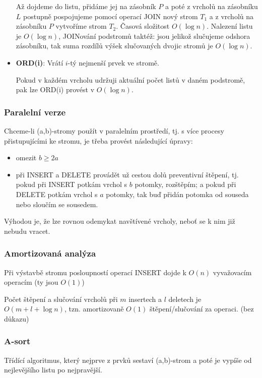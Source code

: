 \documentclass[11pt]{report} %
\numberwithin{equation}{section}
\begin{document}
\begin{itemize}
	Až dojdeme do listu, přidáme jej na zásobník $P$ a poté z vrcholů na zásobníku $L$ postupně pospojujeme pomocí operací JOIN nový strom $T_1$ a z vrcholů na zásobníku $P$ vytvoříme strom $T_2$. 
	Časová složitost $O(\log n)$. Nalezení listu je $O(\log n)$, JOINování podstromů taktéž: jsou jelikož slučujeme odshora zásobníku, tak suma rozdílů výšek slučovaných dvojic stromů je $O(\log n)$.
	
	\item \textbf{ORD(i)}:
	Vrátí $i$-tý nejmenší prvek ve stromě. 
	
	Pokud v každém vrcholu udržuji aktuální počet listů v daném podstromě, pak lze ORD(i) provést v $O(\log n)$.
	
	
\end{itemize}

\subsubsection{Paralelní verze}
Chceme-li (a,b)-stromy použít v paralelním prostředí, tj. s více procesy přistupujícími ke stromu, je třeba provést následující úpravy:
\begin{itemize}
	
	
	\item omezit $b \geq 2a$
	\item při INSERT a DELETE provádět už cestou dolů preventivní štěpení, tj. pokud při INSERT potkám vrchol s $b$ potomky, rozštěpím; a pokud při DELETE potkám vrchol s $a$ potomky, tak buď přidán potomka od souseda nebo sloučím se sousedem.
\end{itemize}

Výhodou je, že lze rovnou odemykat navštívené vrcholy, neboť se k nim již nebudu vracet.

\subsubsection{Amortizovaná analýza}
Při výstavbě stromu posloupností operací INSERT dojde k $O(n)$ vyvažovacím operacím (ty jsou $O(1)$)

Počet štěpení a slučování vrcholů při $m$ insertech a $l$ deletech je $O(m + l + \log n)$, tzn. amortizovaně $O(1)$ štěpení/slučování za operaci. (bez důkazu)


\subsubsection{A-sort}
Třídící algoritmus, který nejprve z prvků sestaví (a,b)-strom a poté je vypíše od nejlevějšího listu po nejpravější.
\end{document}
